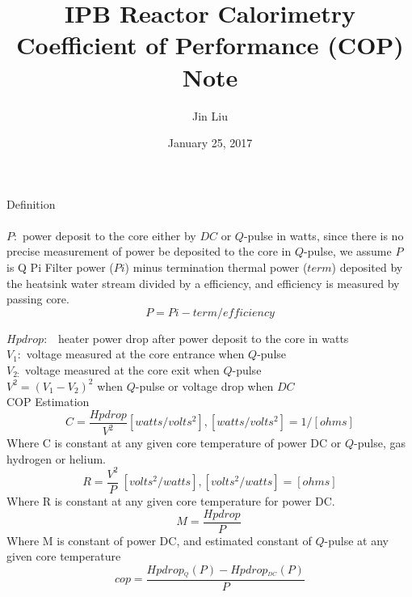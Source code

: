 \documentclass{article}
\title{IPB Reactor Calorimetry Coefficient of Performance (COP) Note}
\author{Jin Liu}
\date{January 25, 2017}
\begin{document}
\maketitle

Definition\\
\\
$P:$ power deposit to the core either by $DC$ or $Q$-pulse in watts, since there is no precise measurement of power be deposited to the core in $Q$-pulse, we assume $P$ is Q Pi Filter power ($Pi$) minus termination thermal power ($term$) deposited by the heatsink water stream divided by a efficiency, and efficiency is measured by passing core.\\
\begin{equation}
P = Pi - term/efficiency \label{1}%
\end{equation}

$Hpdrop:$ \ heater power drop after power deposit to the core in watts\\

$V_{1}:$ voltage measured at the core entrance when $Q$-pulse\\

$V_{2:}$ voltage measured at the core exit when $Q$-pulse\\

$V^{2}=(V_{1}-V_{2})^{2}$ when $Q$-pulse or voltage drop when $DC$ \\

COP Estimation\\
\begin{equation}
C=\frac{Hpdrop}{V^{2}}[watts/volts^{2}], [watts/volts^{2}] = 1/[ohms] \label{2}%
\end{equation}
%
Where C is constant at any given core temperature of power DC or $Q$-pulse, gas hydrogen or helium.\\ 
 
\begin{equation}
R=\frac{V^{2}}{P}\ [volts^{2}/watts], [volts^{2}/watts]=[ohms]\label{3}%
\end{equation}
%
Where R is constant at any given core temperature for power DC.\\
\begin{equation}
M=\frac{Hpdrop}{P}\ \label{4}%
\end{equation}
%
Where M is constant of power DC, and estimated constant of $Q$-pulse at any given core temperature\\

\begin{equation}
cop=\frac{Hpdrop_{^{Q}}(P)-Hpdrop_{^{DC}}(P)}{P}\label{4}%
\end{equation}
\end{document}
